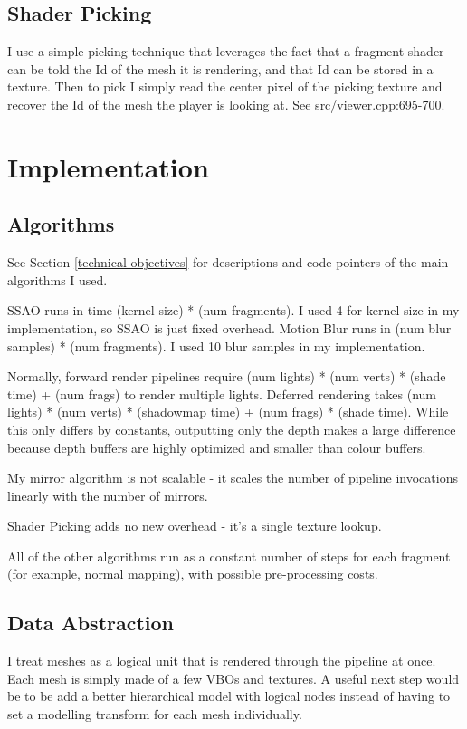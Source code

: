 \documentclass[oneside]{book}
\begin{document}
    \subsection{Shader Picking} \label{picking}
      I use a simple picking technique that leverages the fact that a fragment shader can be told the Id of the mesh it is rendering, and that Id can be stored in a texture. Then to pick I simply read the center pixel of the picking texture and recover the Id of the mesh the player is looking at. See src/viewer.cpp:695-700.



  \section{Implementation}
    \subsection{Algorithms}
      See Section \ref{technical-objectives} for descriptions and code pointers of the main algorithms I used.

      SSAO runs in time (kernel size) * (num fragments). I used 4 for kernel size in my implementation, so SSAO is just fixed overhead.
      Motion Blur runs in (num blur samples) * (num fragments). I used 10 blur samples in my implementation.

      Normally, forward render pipelines require (num lights) * (num verts) * (shade time) + (num frags) to render multiple lights. Deferred rendering takes (num lights) * (num verts) * (shadowmap time) + (num frags) * (shade time). While this only differs by constants, outputting only the depth makes a large difference because depth buffers are highly optimized and smaller than colour buffers.

      My mirror algorithm is not scalable - it scales the number of pipeline invocations linearly with the number of mirrors.

      Shader Picking adds no new overhead - it's a single texture lookup.

      All of the other algorithms run as a constant number of steps for each fragment (for example, normal mapping), with possible pre-processing costs.

    \subsection{Data Abstraction}
      I treat meshes as a logical unit that is rendered through the pipeline at once. Each mesh is simply made of a few VBOs and textures. A useful next step would be to be add a better hierarchical model with logical nodes instead of having to set a modelling transform for each mesh individually.
\end{document}
